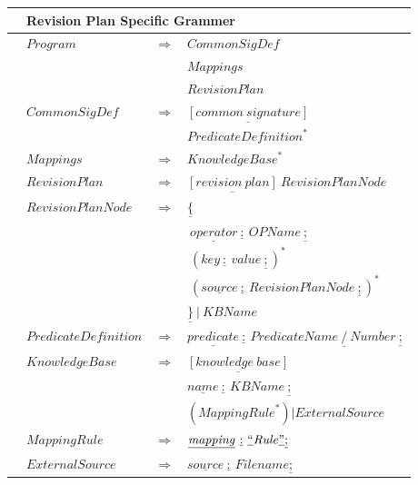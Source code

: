 \documentclass[a4paper,11pt]{article}
\theoremstyle{definition}
\begin{document}
\begin{tabularx}{\textwidth}{p{0in}llX}
					\hline
					& \multicolumn{3}{l}{Revision Plan Specific Grammer} \\
					\hline
					
					&	$\mathit{Program}$										&	$\Rightarrow$	&	$\mathit{CommonSigDef}$ \\
					&															&					&	$\mathit{Mappings}$ \\
					&															&					&	$\mathit{RevisionPlan}$ \\
					&	$\mathit{CommonSigDef}$									&	$\Rightarrow$	&	$\underline{[\mathit{common\ signature}]}$ \\
					&															&					&	$\mathit{PredicateDefinition}^{*}$ \\
					&	$\mathit{Mappings}$										&	$\Rightarrow$	&	$\mathit{KnowledgeBase}^{*}$ \\
					&	$\mathit{RevisionPlan}$									&	$\Rightarrow$	&	$\underline{[\mathit{revision\ plan}]} \  \mathit{RevisionPlanNode}$ \\
					&	$\mathit{RevisionPlanNode}$								&	$\Rightarrow$	&	$\underline{\{}$ \\
					&															&					&	$\  \underline{\mathit{operator}} \ \underline{:} \  \mathit{OPName} \  \underline{;}$ \\
					&															&					&	$\  (\mathit{key} \ \underline{:} \  \mathit{value} \  \underline{;})^{*}$ \\
					&															&					&	$\  (\underline{\mathit{source}} \ \underline{:} \  \mathit{RevisionPlanNode} \  \underline{;})^{*}$ \\
					&															&					&	$\underline{\}} \  | \  KBName$ \\
					&	$\mathit{PredicateDefinition}$							&	$\Rightarrow$	&	$\underline{\mathit{predicate}} \ \underline{:} \  \mathit{PredicateName}  \  \underline{/} \  \mathit{Number} \  \underline{;}$ \\
					&	$\mathit{KnowledgeBase}$								&	$\Rightarrow$	&	$\underline{[\mathit{knowledge\ base}]}$ \\
					&															&					&	$\underline{\mathit{name}} \ \underline{:} \  \mathit{KBName} \  \underline{;}$ \\
					&															&					&	$(\mathit{MappingRule}^{*}) | \mathit{ExternalSource}$ \\
					&	$\mathit{MappingRule}$									&	$\Rightarrow$	&	$\underline{\mathit{mapping}} \ \underline{:} \  \underline{``} \mathit{Rule} \underline{"} \underline{;}$ \\
					&	$\mathit{ExternalSource}$								&	$\Rightarrow$	&	$\underline{\mathit{source}} \ \underline{:} \  \mathit{Filename} \underline{;}$ \\

\end{tabularx}
\end{document}
